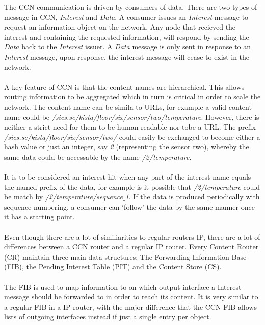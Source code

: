The CCN communication \cite{Jacobson2009} is driven by consumers of data. There are two types of message in CCN, \textit{Interest} and \textit{Data}. A consumer issues an \textit{Interest} message to request an information object on the network. Any node that recieved the interest and containing the requested information, will respond by sending the \textit{Data} back to the \textit{Interest} issuer. A \textit{Data} message is only sent in response to an \textit{Interest} message, upon response, the interest message will cease to exist in the network.
\\\\
A key feature of CCN is that the content names are hierarchical. This allows routing information to be aggregated which in turn is critical in order to scale the network. The content name can be simila to URLs, for example a valid content name could be \textit{/sics.se/kista/floor/six/sensor/two/temperature}. However, there is neither a strict need for them to be human-readable nor tobe a URL. The prefix \textit{/sics.se/kista/floor/six/sensor/two/} could easily be exchanged to become either a hash value or just an integer, say \textit{2} (representing the sensor two), whereby the same data could be accessable by the name \textit{/2/temperature}.
\\\\
It is to be considered an interest hit  when any part of the interest name equals the named prefix of the data, for example is it possible that \textit{/2/temperature} could be match by \textit{/2/temperature/sequence$\_$1}. If the data is produced periodically with sequence numbering, a consumer can `follow' the data by the same manner once it has a starting point. 
\\\\
Even though there are a lot of similiarities to regular routers IP, there are a lot of differences between a CCN router and a regular IP router.
Every Content Router (CR) maintain three main data structures: The Forwarding Information Base (FIB), the Pending Interest Table (PIT) and the Content Store (CS).
\\\\
The FIB is used to map information to on which output interface a Interest message should be forwarded to in order to reach its content. It is very similar to a regular FIB in a IP router, with the major difference that the CCN FIB allows lists of outgoing interfaces instead if just a single entry per object.
